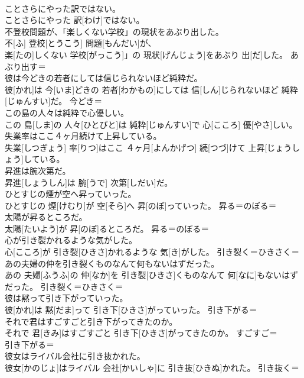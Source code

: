 \documentclass[8pt]{extreport}
\begin{document}
\begin{CJK}{UTF8}{min}
\\	ことさらにやった訳ではない。	
\\	ことさらにやった 訳[わけ]ではない。	
\\	不登校問題が、「楽しくない学校」の現状をあぶり出した。	
\\	不[ふ] 登校[とうこう] 問題[もんだい]が、
\\	楽[たの]しくない 学校[がっこう]」の 現状[げんじょう]をあぶり 出[だ]した。	あぶり出す＝ 
\\	彼は今どきの若者にしては信じられないほど純粋だ。	
\\	彼[かれ]は 今[いま]どきの 若者[わかもの]にしては 信[しん]じられないほど 純粋[じゅんすい]だ。	今どき＝ 
\\	この島の人々は純粋で心優しい。	
\\	この 島[しま]の 人々[ひとびと]は 純粋[じゅんすい]で 心[こころ] 優[やさ]しい。	
\\	失業率はここ４ヶ月続けて上昇している。	
\\	失業[しつぎょう] 率[りつ]はここ ４ヶ月[よんかげつ] 続[つづ]けて 上昇[じょうしょう]している。	
\\	昇進は腕次第だ。	
\\	昇進[しょうしん]は 腕[うで] 次第[しだい]だ。	
\\	ひとすじの煙が空へ昇っていった。	
\\	ひとすじの 煙[けむり]が 空[そら]へ 昇[のぼ]っていった。	昇る＝のぼる＝ 
\\	太陽が昇るところだ。	
\\	太陽[たいよう]が 昇[のぼ]るところだ。	昇る＝のぼる＝ 
\\	心が引き裂かれるような気がした。	
\\	心[こころ]が 引き裂[ひきさ]かれるような 気[き]がした。	引き裂く＝ひきさく＝ 
\\	あの夫婦の仲を引き裂くものなんて何もないはずだった。	
\\	あの 夫婦[ふうふ]の 仲[なか]を 引き裂[ひきさ]くものなんて 何[なに]もないはずだった。	引き裂く＝ひきさく＝ 
\\	彼は黙って引き下がっていった。	
\\	彼[かれ]は 黙[だま]って 引き下[ひきさ]がっていった。	引き下がる＝ 
\\	それで君はすごすごと引き下がってきたのか。	
\\	それで 君[きみ]はすごすごと 引き下[ひきさ]がってきたのか。	すごすご＝ 
\\	引き下がる＝ 
\\	彼女はライバル会社に引き抜かれた。	
\\	彼女[かのじょ]はライバル 会社[かいしゃ]に 引き抜[ひきぬ]かれた。	引き抜く＝ 

\end{CJK}
\end{document}
